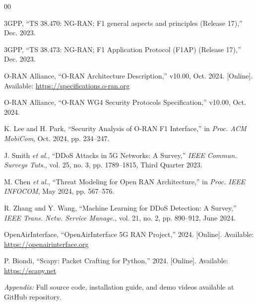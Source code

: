 \documentclass[conference]{IEEEtran}
\begin{document}
\begin{thebibliography}{00}

3GPP, ``TS 38.470: NG-RAN; F1 general aspects and principles (Release 17),'' Dec. 2023.

3GPP, ``TS 38.473: NG-RAN; F1 Application Protocol (F1AP) (Release 17),'' Dec. 2023.

O-RAN Alliance, ``O-RAN Architecture Description,'' v10.00, Oct. 2024. [Online]. Available: \url{https://specifications.o-ran.org}

O-RAN Alliance, ``O-RAN WG4 Security Protocols Specification,'' v10.00, Oct. 2024.

K. Lee and H. Park, ``Security Analysis of O-RAN F1 Interface,'' in \textit{Proc. ACM MobiCom}, Oct. 2024, pp. 234--247.

J. Smith \textit{et al.}, ``DDoS Attacks in 5G Networks: A Survey,'' \textit{IEEE Commun. Surveys Tuts.}, vol. 25, no. 3, pp. 1789--1815, Third Quarter 2023.

M. Chen \textit{et al.}, ``Threat Modeling for Open RAN Architecture,'' in \textit{Proc. IEEE INFOCOM}, May 2024, pp. 567--576.

R. Zhang and Y. Wang, ``Machine Learning for DDoS Detection: A Survey,'' \textit{IEEE Trans. Netw. Service Manage.}, vol. 21, no. 2, pp. 890--912, June 2024.

OpenAirInterface, ``OpenAirInterface 5G RAN Project,'' 2024. [Online]. Available: \url{https://openairinterface.org}

P. Biondi, ``Scapy: Packet Crafting for Python,'' 2024. [Online]. Available: \url{https://scapy.net}

\end{thebibliography}

\vspace{12pt}

\noindent
\textit{Appendix:} Full source code, installation guide, and demo videos available at GitHub repository.
\end{document}
